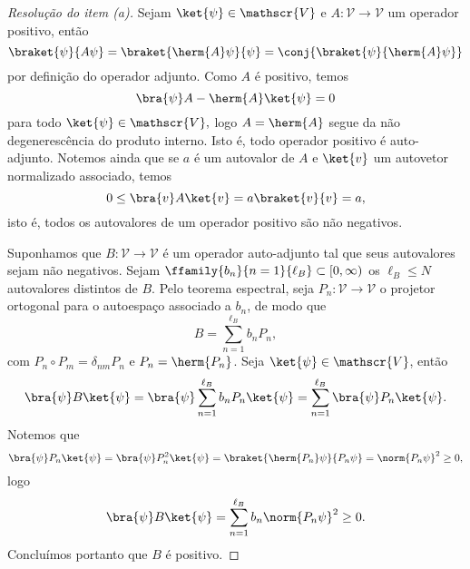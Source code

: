 \begin{proof}[Resolução do item (a)]
    Sejam \(\ket{\psi} \in \mathscr{V}\) e \(A : \mathscr{V} \to \mathscr{V}\) um operador positivo, então
    \begin{equation*}
        \braket{\psi}{A\psi} = \braket{\herm{A}\psi}{\psi} = \conj{\braket{\psi}{\herm{A}\psi}}
    \end{equation*}
    por definição do operador adjunto. Como \(A\) é positivo, temos
    \begin{equation*}
        \bra{\psi}A-\herm{A}\ket{\psi} = 0
    \end{equation*}
    para todo \(\ket{\psi} \in \mathscr{V},\) logo \(A = \herm{A}\) segue da não degenerescência do produto interno. Isto é, todo operador positivo é auto-adjunto. Notemos ainda que se \(a\) é um autovalor de \(A\) e \(\ket{v}\) um autovetor normalizado associado, temos
    \begin{equation*}
        0 \leq \bra{v}A\ket{v} = a \braket{v}{v} = a,
    \end{equation*}
    isto é, todos os autovalores de um operador positivo são não negativos.

    Suponhamos que \(B : \mathscr{V} \to \mathscr{V}\) é um operador auto-adjunto tal que seus autovalores sejam não negativos. Sejam \(\ffamily{b_n}{n=1}{\ell_B} \subset [0, \infty)\) os \(\ell_B \leq N\) autovalores distintos de \(B\). Pelo teorema espectral, seja \(P_n : \mathscr{V} \to \mathscr{V}\) o projetor ortogonal para o autoespaço associado a \(b_n\), de modo que
    \begin{equation*}
        B = \sum_{n=1}^{\ell_B} b_n P_n,
    \end{equation*}
    com \(P_n \circ P_m = \delta_{nm} P_n\) e \(P_n = \herm{P_n}\). Seja \(\ket{\psi} \in \mathscr{V}\), então
    \begin{equation*}
        \bra{\psi}B\ket{\psi} = \bra{\psi}\sum_{n=1}^{\ell_B} b_n P_n\ket{\psi} = \sum_{n=1}^{\ell_B} \bra{\psi}P_n\ket{\psi}.
    \end{equation*}
    Notemos que
    \begin{equation*}
        \bra{\psi}P_n\ket{\psi} = \bra{\psi}P_n^2\ket{\psi} = \braket{\herm{P_n}\psi}{P_n \psi} = \norm{P_n\psi}^2 \geq 0,
    \end{equation*}
    logo
    \begin{equation*}
        \bra{\psi}B\ket{\psi} = \sum_{n=1}^{\ell_B} b_n \norm{P_n\psi}^2 \geq 0.
    \end{equation*}
    Concluímos portanto que \(B\) é positivo.
\end{proof}
